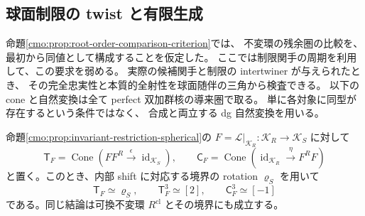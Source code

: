 \subsection{球面制限の twist と有限生成}
\label{cmo:subsec:spherical-comparison}

命題\ref{cmo:prop:root-order-comparison-criterion}では、
不変環の残余圏の比較を、最初から同値として構成することを仮定した。
ここでは制限関手の周期を利用して、この要求を弱める。
実際の候補関手と制限の intertwiner が与えられたとき、
その完全忠実性と本質的全射性を球面随伴の三角から検査できる。
以下の cone と自然変換は全て perfect 双加群核の導来圏で取る。
単に各対象に同型が存在するという条件ではなく、
合成と両立する dg 自然変換を用いる。

\begin{proposition}
\label{cmo:prop:spherical-restriction-twist}
命題\ref{cmo:prop:invariant-restriction-spherical}の
$F=\mathcal L|_{\mathcal K_R}:\mathcal K_R\to\mathcal K_S$ に対して
\[
 \mathsf T_F=\operatorname{Cone}
   (FF^R\xrightarrow{\epsilon}\operatorname{id}_{\mathcal K_S}),
 \qquad
 \mathsf C_F=\operatorname{Cone}
   (\operatorname{id}_{\mathcal K_R}\xrightarrow{\eta}F^RF)
\]
と置く。このとき、内部 shift に対応する境界の rotation $\varrho_S$ を用いて
\begin{equation}
\label{cmo:eq:spherical-restriction-periods}
 \mathsf T_F\simeq\varrho_S,\qquad
 \mathsf T_F^3\simeq[2],\qquad
 \mathsf C_F^3\simeq[-1]
\end{equation}
である。同じ結論は可換不変環 $R^{\mathrm{cl}}$ とその境界にも成立する。
\end{proposition}

